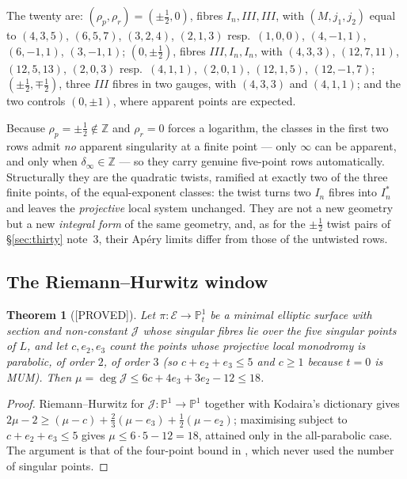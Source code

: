 \documentclass[11pt,reqno]{amsart}
\theoremstyle{plain}
\newtheorem{theorem}{Theorem}[section]
\theoremstyle{definition}
\theoremstyle{remark}
\theoremstyle{plain}
\newcommand{\Z}{\mathbb{Z}}
\newcommand{\PP}{\mathbb{P}}
\newcommand{\Jm}{\mathcal J}
\newcommand{\Proved}{\textup{\textsf{[PROVED]}}}
\begin{document}
The twenty are: $(\rho_p,\rho_r)=(\pm\tfrac12,0)$, fibres $I_n,III,III$, with
$(M,j_1,j_2)$ equal to $(4,3,5)$, $(6,5,7)$, $(3,2,4)$, $(2,1,3)$ resp.\
$(1,0,0)$, $(4,-1,1)$, $(6,-1,1)$, $(3,-1,1)$; $(0,\pm\tfrac12)$, fibres
$III,I_n,I_n$, with $(4,3,3)$, $(12,7,11)$, $(12,5,13)$, $(2,0,3)$ resp.\
$(4,1,1)$, $(2,0,1)$, $(12,1,5)$, $(12,-1,7)$; $(\pm\tfrac12,\mp\tfrac12)$,
three $III$ fibres in two gauges, with $(4,3,3)$ and $(4,1,1)$; and the two
controls $(0,\pm1)$, where apparent points are expected.


Because $\rho_p=\pm\tfrac12\notin\Z$ and $\rho_r=0$ forces a logarithm, the
classes in the first two rows admit \emph{no} apparent singularity at a finite
point --- only $\infty$ can be apparent, and only when $\delta_\infty\in\Z$ ---
so they carry genuine five-point rows automatically. Structurally they are the
quadratic twists, ramified at exactly two of the three finite points, of the
equal-exponent classes: the twist turns two $I_n$ fibres into $I_n^*$ and leaves
the \emph{projective} local system unchanged. They are not a new geometry but a
new \emph{integral form} of the same geometry, and, as for the $\pm\tfrac12$
twist pairs of \S\ref{sec:thirty} note~3, their Ap\'ery limits differ from those
of the untwisted rows.

\subsection{The Riemann--Hurwitz window}\label{sec:RH}

\begin{theorem}[\Proved]\label{thm:F3}
Let $\pi:\mathcal E\to\PP^1_t$ be a minimal elliptic surface with section and
non-constant $\Jm$ whose singular fibres lie over the five singular points of
$L$, and let $c,e_2,e_3$ count the points whose projective local monodromy is
parabolic, of order $2$, of order $3$ \textup{(}so $c+e_2+e_3\le5$ and $c\ge1$
because $t=0$ is MUM\textup{)}. Then
$\mu=\deg\Jm\le6c+4e_3+3e_2-12\le18$.
\end{theorem}

\begin{proof}
Riemann--Hurwitz for $\Jm:\PP^1\to\PP^1$ together with Kodaira's dictionary gives
$2\mu-2\ge(\mu-c)+\tfrac23(\mu-e_3)+\tfrac12(\mu-e_2)$; maximising subject to
$c+e_2+e_3\le5$ gives $\mu\le6\cdot5-12=18$, attained only in the all-parabolic
case. The argument is that of the four-point bound in \cite{CLASS}, which never
used the number of singular points.
\end{proof}
\end{document}
